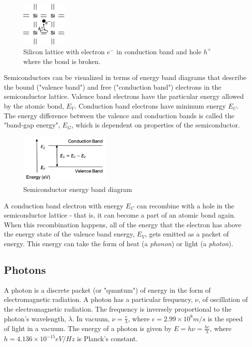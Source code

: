 	\begin{figure}[H]{
		\centering
		\includegraphics[width=0.2\textwidth]{n_led/si_lattice_wHole.png}
		\caption{Silicon lattice with electron $e^-$ in conduction band and hole $h^+$ where the bond is broken.}
		\vspace{-5mm}}
	\label{fig:SiLatticeWHole}
\end{figure}


Semiconductors can be visualized in terms of energy band diagrams that describe the bound ("valence band") and free ("conduction band") electrons in the semiconductor lattice. Valence band electrons have the particular energy allowed by the atomic bond, $E_V$. Conduction band electrons have minimum energy $E_C$. The energy difference between the valence and conduction bands is called the "band-gap energy", $E_G$, which is dependent on properties of the semiconductor.

	\begin{figure}[H]{
		\centering
		\includegraphics[width=0.4\textwidth]{n_led/band_diagram.png}
		\caption{Semiconductor energy band diagram}
		\vspace{-5mm}}
	\label{fig:BandDiagram}
\end{figure}

A conduction band electron with energy $E_C$ can recombine with a hole in the semiconductor lattice - that is, it can become a part of an atomic bond again. When this recombination happens, all of the energy that the electron has above the energy state of the valence band energy, $E_V$, gets emitted as a packet of energy. This energy can take the form of heat (a \textit{phonon}) or light (a \textit{photon}).

\subsection{Photons}
A photon is a discrete packet (or "quantum") of energy in the form of electromagnetic radiation. A photon has a particular frequency, $\nu$, of oscillation of the electromagnetic radiation. The frequency is inversely proportional to the photon's wavelength, $\lambda$. In vacuum, $\nu = \frac{c}{\lambda}$, where $c = 2.99\times10^8 m/s$ is the speed of light in a vacuum. The energy of a photon is given by $E = h\nu = \frac{hc}{\lambda}$, where $h = 4.136\times10^{-15} eV/Hz$ is Planck's constant.

